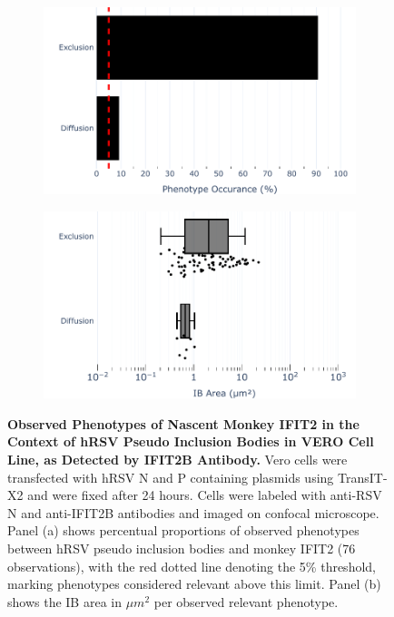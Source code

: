 \begin{figure}
    \begin{subfigure}{0.495\textwidth}
        \caption{}
        \includegraphics[width=1\linewidth]{08. Chapter 3/Figs/03. pIB/03. IFIT2/03. IFIT2B/04. bar_i2b_vero_hnhp.pdf} 
    \end{subfigure}
    \begin{subfigure}{0.495\textwidth}
        \caption{}
        \includegraphics[width=1\linewidth]{08. Chapter 3/Figs/03. pIB/03. IFIT2/03. IFIT2B/05. box_i2b_vero_hnhp.pdf}
    \end{subfigure}
    \caption[Observed Phenotypes of Nascent Monkey IFIT2 in the Context of hRSV Pseudo Inclusion Bodies in VERO Cell Line, as Detected by IFIT2B Antibody.]{\textbf{Observed Phenotypes of Nascent Monkey IFIT2 in the Context of hRSV Pseudo Inclusion Bodies in VERO Cell Line, as Detected by IFIT2B Antibody.} Vero cells were transfected with hRSV N and P containing plasmids using TransIT-X2 and were fixed after 24 hours. Cells were labeled with anti-RSV N and anti-IFIT2B antibodies and imaged on confocal microscope. Panel (a) shows percentual proportions of observed phenotypes between hRSV pseudo inclusion bodies and monkey IFIT2 (76 observations), with the red dotted line denoting the 5\% threshold, marking phenotypes considered relevant above this limit. Panel (b) shows the IB area in \(\mu m^2\) per observed relevant phenotype.}
    \label{fig:Observed Phenotypes of Nascent Monkey IFIT2 in the Context of hRSV Pseudo Inclusion Bodies in VERO Cell Line, as Detected by IFIT2B Antibody}
\end{figure}

